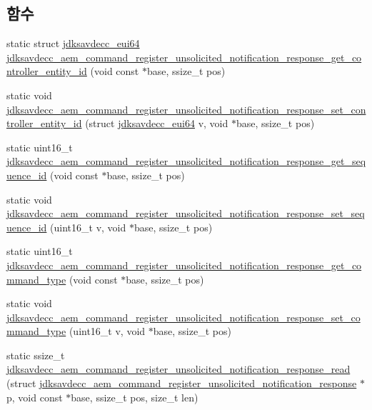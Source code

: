 \subsection*{함수}
\begin{DoxyCompactItemize}
\item 
static struct \hyperlink{structjdksavdecc__eui64}{jdksavdecc\+\_\+eui64} \hyperlink{group__command__register__unsolicited__notification__response_gabb1d7fc5eebc7d298aad0393b1473986}{jdksavdecc\+\_\+aem\+\_\+command\+\_\+register\+\_\+unsolicited\+\_\+notification\+\_\+response\+\_\+get\+\_\+controller\+\_\+entity\+\_\+id} (void const $\ast$base, ssize\+\_\+t pos)
\item 
static void \hyperlink{group__command__register__unsolicited__notification__response_ga1803b4e887c3085f8810222c2638d96f}{jdksavdecc\+\_\+aem\+\_\+command\+\_\+register\+\_\+unsolicited\+\_\+notification\+\_\+response\+\_\+set\+\_\+controller\+\_\+entity\+\_\+id} (struct \hyperlink{structjdksavdecc__eui64}{jdksavdecc\+\_\+eui64} v, void $\ast$base, ssize\+\_\+t pos)
\item 
static uint16\+\_\+t \hyperlink{group__command__register__unsolicited__notification__response_ga96eb66994c07c9b7aa59b2e69f6c682b}{jdksavdecc\+\_\+aem\+\_\+command\+\_\+register\+\_\+unsolicited\+\_\+notification\+\_\+response\+\_\+get\+\_\+sequence\+\_\+id} (void const $\ast$base, ssize\+\_\+t pos)
\item 
static void \hyperlink{group__command__register__unsolicited__notification__response_gab05b2288c5a53d6edaa695284c26ba5c}{jdksavdecc\+\_\+aem\+\_\+command\+\_\+register\+\_\+unsolicited\+\_\+notification\+\_\+response\+\_\+set\+\_\+sequence\+\_\+id} (uint16\+\_\+t v, void $\ast$base, ssize\+\_\+t pos)
\item 
static uint16\+\_\+t \hyperlink{group__command__register__unsolicited__notification__response_ga9c806f79d437cabd7f45faf5e1fd9784}{jdksavdecc\+\_\+aem\+\_\+command\+\_\+register\+\_\+unsolicited\+\_\+notification\+\_\+response\+\_\+get\+\_\+command\+\_\+type} (void const $\ast$base, ssize\+\_\+t pos)
\item 
static void \hyperlink{group__command__register__unsolicited__notification__response_gad82a01e8a4b677b4b49947ba81aada4d}{jdksavdecc\+\_\+aem\+\_\+command\+\_\+register\+\_\+unsolicited\+\_\+notification\+\_\+response\+\_\+set\+\_\+command\+\_\+type} (uint16\+\_\+t v, void $\ast$base, ssize\+\_\+t pos)
\item 
static ssize\+\_\+t \hyperlink{group__command__register__unsolicited__notification__response_gad5b65676e63204bcbc249135a0d1d9be}{jdksavdecc\+\_\+aem\+\_\+command\+\_\+register\+\_\+unsolicited\+\_\+notification\+\_\+response\+\_\+read} (struct \hyperlink{structjdksavdecc__aem__command__register__unsolicited__notification__response}{jdksavdecc\+\_\+aem\+\_\+command\+\_\+register\+\_\+unsolicited\+\_\+notification\+\_\+response} $\ast$p, void const $\ast$base, ssize\+\_\+t pos, size\+\_\+t len)

\end{DoxyCompactItemize}
